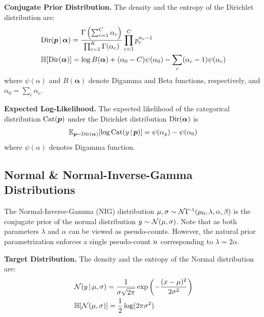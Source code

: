 \textbf{Conjugate Prior Distribution.} The density and the entropy of the Dirichlet distribution are:
%
\begin{align}\label{eq:density-entropy-dirichlet_007}
        &\operatorname{Dir}(\bm{p} \,|\, \bm{\alpha}) = \frac{\Gamma\left(\sum_{c=1}^C{\alpha_c}\right)}{\prod_{c=1}^K{\Gamma(\alpha_c)}} \prod_{c=1}^C{p_c^{\alpha_c-1}}\\
        &\operatorname{\mathbb{H}}[\operatorname{Dir}(\bm{\alpha})] = \log B(\bm{\alpha}) + (\alpha_0 - C) \psi(\alpha_0) - \sum_c (\alpha_c - 1) \psi(\alpha_c)
\end{align}
%
where $\psi(\alpha)$ and $B(\bm{\alpha})$ denote Digamma and Beta functions, respectively, and $\alpha_0 = \sum_{c}{\alpha_c}$.

\textbf{Expected Log-Likelihood.} The expected likelihood of the categorical distribution $\operatorname{Cat}(\bm{p})$ under the Dirichlet distribution $\operatorname{Dir}(\bm{\alpha})$ is
%
\begin{align}\label{eq:expected-likelihood-cat-dir_007}
    \operatorname{\mathbb{E}}_{\bm{p} \sim \operatorname{Dir}(\bm{\alpha})}[\log \operatorname{Cat}(y \,|\, \bm{p})] = \psi(\alpha_{y}) - \psi(\alpha_0)
\end{align}
%
where $\psi(\alpha)$ denotes Digamma function.


\subsection{Normal \& Normal-Inverse-Gamma Distributions}

The Normal-Inverse-Gamma (NIG) distribution $\mu, \sigma \sim \operatorname{\mathcal{N}\Gamma^{-1}}(\mu_0, \lambda, \alpha, \beta)$ is the conjugate prior of the normal distribution $y \sim \operatorname{\mathcal{N}}(\mu, \sigma)$. Note that as both parameters $\lambda$ and $\alpha$ can be viewed as pseudo-counts. However, the natural prior parametrization enforces a single pseudo-count $n$ corresponding to $\lambda = 2 \alpha$.

\textbf{Target Distribution.} The density and the entropy of the Normal distribution are:
%
\begin{align}\label{eq:density-entropy-normal}
    &\operatorname{\mathcal{N}}(y \,|\, \mu, \sigma) = \frac{1}{\sigma \sqrt{2\pi}} \exp\left( -\frac{(x - \mu)^2}{2\sigma^2} \right)\\
    &\operatorname{\mathbb{H}}[\operatorname{\mathcal{N}}(\mu, \sigma)] = \frac{1}{2}\log(2\pi\sigma^2)
\end{align}

